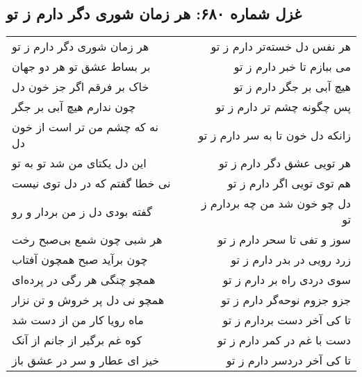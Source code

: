 \begin{center}
\section*{غزل شماره ۶۸۰: هر زمان شوری دگر دارم ز تو}
\label{sec:680}
\begin{longtable}{l p{0.5cm} r}
هر زمان شوری دگر دارم ز تو
&&
هر نفس دل خسته‌تر دارم ز تو
\\
بر بساط عشق تو هر دو جهان
&&
می ببازم تا خبر دارم ز تو
\\
خاک بر فرقم اگر جز خون دل
&&
هیچ آبی بر جگر دارم ز تو
\\
چون ندارم هیچ آبی بر جگر
&&
پس چگونه چشم تر دارم ز تو
\\
نه که چشم من تر است از خون دل
&&
زانکه دل خون تا به سر دارم ز تو
\\
این دل یکتای من شد تو به تو
&&
هر تویی عشق دگر دارم ز تو
\\
نی خطا گفتم که در دل توی نیست
&&
هم توی تویی اگر دارم ز تو
\\
گفته بودی دل ز من بردار و رو
&&
دل چو خون شد من چه بردارم ز تو
\\
هر شبی چون شمع بی‌صبح رخت
&&
سوز و تفی تا سحر دارم ز تو
\\
چون برآید صبح همچون آفتاب
&&
زرد رویی در بدر دارم ز تو
\\
همچو چنگی هر رگی در پرده‌ای
&&
سوی دردی راه بر دارم ز تو
\\
همچو نی دل پر خروش و تن نزار
&&
جزو جزوم نوحه‌گر دارم ز تو
\\
ماه رویا کار من از دست شد
&&
تا کی آخر دست بردارم ز تو
\\
کوه غم برگیر از جانم از آنک
&&
دست با غم در کمر دارم ز تو
\\
خیز ای عطار و سر در عشق باز
&&
تا کی آخر دردسر دارم ز تو
\\
\end{longtable}
\end{center}
